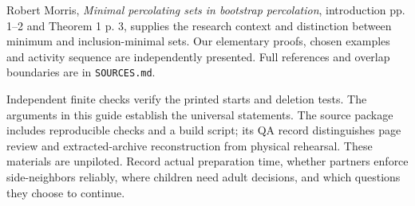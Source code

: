 Robert Morris, \emph{Minimal percolating sets in bootstrap percolation}, introduction pp. 1--2 and Theorem 1 p. 3, supplies the research context and distinction between minimum and inclusion-minimal sets. Our elementary proofs, chosen examples and activity sequence are independently presented. Full references and overlap boundaries are in \texttt{SOURCES.md}.

Independent finite checks verify the printed starts and deletion tests. The arguments in this guide establish the universal statements. The source package includes reproducible checks and a build script; its QA record distinguishes page review and extracted-archive reconstruction from physical rehearsal. These materials are unpiloted. Record actual preparation time, whether partners enforce side-neighbors reliably, where children need adult decisions, and which questions they choose to continue.
